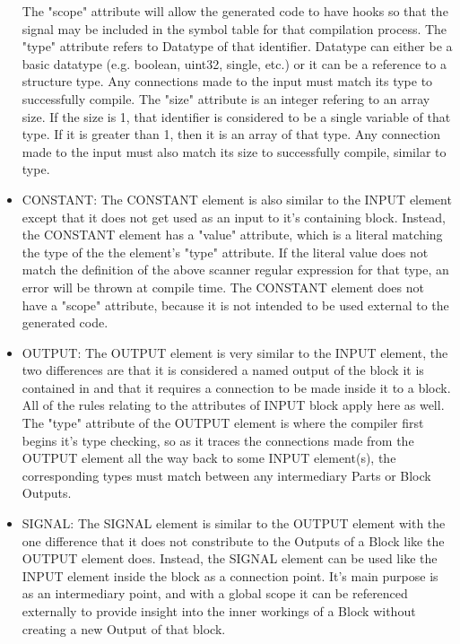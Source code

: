 \begin{itemize}[label={}]
The "scope" attribute will allow the generated code to have hooks so that the signal may be included in the symbol table for that compilation process.
The "type" attribute refers to Datatype of that identifier.
Datatype can either be a basic datatype (e.g. boolean, uint32, single, etc.) or it can be a reference to a structure type.
Any connections made to the input must match its type to successfully compile.
The "size" attribute is an integer refering to an array size.
If the size is 1, that identifier is considered to be a single variable of that type.
If it is greater than 1, then it is an array of that type.
Any connection made to the input must also match its size to successfully compile, similar to type.
    \item CONSTANT:
The CONSTANT element is also similar to the INPUT element except that it does not get used as an input to it's containing block.
Instead, the CONSTANT element has a "value" attribute, which is a literal matching the type of the the element's "type" attribute.
If the literal value does not match the definition of the above scanner regular expression for that type, an error will be thrown at compile time.
The CONSTANT element does not have a "scope" attribute, because it is not intended to be used external to the generated code.
    \item OUTPUT:
The OUTPUT element is very similar to the INPUT element, the two differences are that it is considered a named output of the block it is contained in and that it requires a connection to be made inside it to a block.
All of the rules relating to the attributes of INPUT block apply here as well.
The "type" attribute of the OUTPUT element is where the compiler first begins it's type checking, so as it traces the connections made from the OUTPUT element all the way back to some INPUT element(s), the corresponding types must match between any intermediary Parts or Block Outputs.
    \item SIGNAL:
The SIGNAL element is similar to the OUTPUT element with the one difference that it does not constribute to the Outputs of a Block like the OUTPUT element does.
Instead, the SIGNAL element can be used like the INPUT element inside the block as a connection point.
It's main purpose is as an intermediary point, and with a global scope it can be referenced externally to provide insight into the inner workings of a Block without creating a new Output of that block.
\end{itemize}
